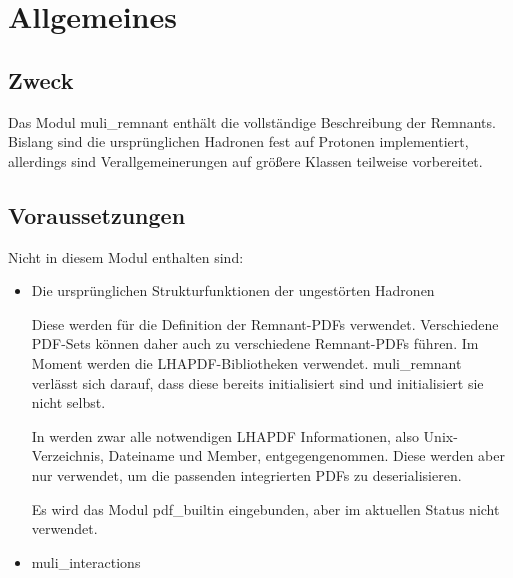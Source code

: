 \section{Allgemeines}
\subsection{Zweck}
\begin{figure}
\end{figure}
Das Modul muli\_remnant enthält die vollständige Beschreibung der Remnants. Bislang sind die ursprünglichen Hadronen fest auf Protonen implementiert, allerdings sind Verallgemeinerungen auf größere Klassen teilweise vorbereitet.
\subsection{Voraussetzungen}
Nicht in diesem Modul enthalten sind:
\begin{itemize}
\item Die ursprünglichen Strukturfunktionen der ungestörten Hadronen

Diese werden für die Definition der Remnant-PDFs verwendet. Verschiedene PDF-Sets können daher auch zu verschiedene Remnant-PDFs führen. Im Moment werden die LHAPDF-Bibliotheken verwendet. muli\_remnant verlässt sich darauf, dass diese bereits initialisiert sind und initialisiert sie nicht selbst.

In  werden zwar alle notwendigen LHAPDF Informationen, also Unix-Verzeichnis, Dateiname und Member, entgegengenommen. Diese werden aber nur verwendet, um die passenden integrierten PDFs  zu deserialisieren.

Es wird das Modul pdf\_builtin eingebunden, aber im aktuellen Status nicht verwendet.

\item muli\_interactions
\end{itemize}
